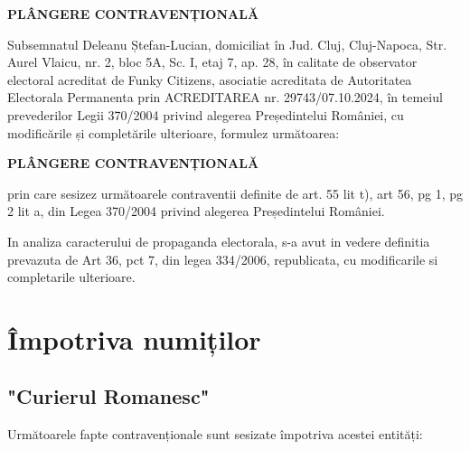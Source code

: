 \documentclass[a4paper,12pt]{article}
\begin{document}
\begin{center}
    \Large\textbf{PLÂNGERE CONTRAVENȚIONALĂ}
\end{center}

\vspace{1cm}

Subsemnatul Deleanu Ștefan-Lucian, domiciliat în Jud. Cluj, Cluj-Napoca, Str. Aurel Vlaicu, nr. 2, bloc 5A, Sc. I, etaj 7, ap. 28, în calitate de observator electoral acreditat de Funky Citizens, asociatie acreditata de Autoritatea Electorala Permanenta prin ACREDITAREA nr. 29743/07.10.2024, în temeiul prevederilor Legii 370/2004 privind alegerea Președintelui României, cu modificările și completările ulterioare, formulez următoarea:

\vspace{0.5cm}
\begin{center}
\textbf{\Large PLÂNGERE CONTRAVENȚIONALĂ}
\end{center}
\vspace{0.5cm}

prin care sesizez următoarele contraventii definite de art. 55 lit t), art 56, pg 1, pg 2 lit a, din Legea 370/2004 privind alegerea Președintelui României.

In analiza caracterului de propaganda electorala, s-a avut in vedere definitia prevazuta de Art 36, pct 7, din legea 334/2006, republicata, cu modificarile si completarile ulterioare.


\newpage
\tableofcontents
\newpage

\section{Împotriva numiților}

\subsection{"Curierul Romanesc"}
Următoarele fapte contravenționale sunt sesizate împotriva acestei entități:
\end{document}
